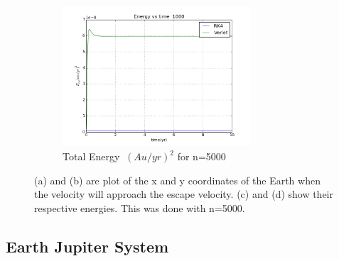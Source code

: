 \documentclass[11pt,a4wide]{article}
\begin{document}
\begin{figure}[H]
\begin{subfigure}[b]{0.5\linewidth}
    \label{fig7:c} 
    \vspace{4ex}
\end{subfigure}%
\begin{subfigure}[b]{0.5\linewidth}
    \centering
    \includegraphics[width=70mm]{EEscape.png}
    \caption{Total Energy $\ (Au/yr)^2$ for n=5000} 
    \label{fig7:d} 
    \vspace{4ex}
\end{subfigure}
\caption{(a) and (b) are plot of the x and y coordinates of the Earth when the velocity will approach the escape velocity. (c) and (d) show their respective energies. This was done with n=5000.}
\end{figure}

\subsection{Earth Jupiter System}
\end{document}
